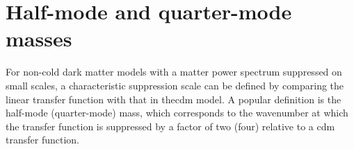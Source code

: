 \section{Half-mode and quarter-mode masses}
For non-cold dark matter models with a matter power spectrum suppressed on small scales, a characteristic suppression scale can be defined by comparing the linear transfer function with that in the\gls{cdm} model. A popular definition is the half-mode (quarter-mode) mass, which corresponds to the wavenumber at which the transfer function is suppressed by a factor of two (four) relative to a \gls{cdm} transfer function.

